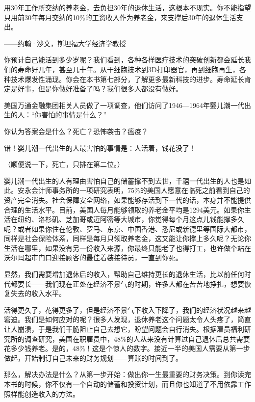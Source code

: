 \begin{BookQuote}
用30年工作所交纳的养老金，去负担30年的退休生活，这根本不现实。你不能指望只用前30年每月交纳的10\%的工资收入作为养老金，来支撑后30年的退休生活支出。

\hfill ——约翰·沙文，斯坦福大学经济学教授
\end{BookQuote}

你预计自己能活到多少岁呢？我们看到，各种各样医疗技术的突破创新都会延长我们的寿命好几年，甚至几十年。从干细胞技术到3D打印器官，再到细胞再生，各种技术爆发性涌现。你会在本书第七部分，了解更多最新科技的进步。寿命延长肯定是好事，但是你做好准备了吗？我们很多人都没有做好。

美国万通金融集团相关人员做了一项调查，他们访问了1946—1964年婴儿潮一代出生的人：“你害怕的事情是什么？”

你认为答案会是什么？死亡？恐怖袭击？瘟疫？

错！婴儿潮一代出生的人最害怕的事情是：人活着，钱花没了！

（顺便说一下，死亡，只排在第二位。）

婴儿潮一代出生的人有理由害怕自己的储蓄撑不到去世，千禧一代出生的人也是如此。安永会计师事务所的一项研究表明，75\%的美国人愿意在临死之前看到自己的资产完全消失。社会保障安全网络，如果能够存活到下一代的话，本身并不能提供合理的生活水平。目前，美国人每月能够领取的养老金平均是1294美元。如果你生活在纽约、洛杉矶、芝加哥或迈阿密等大城市，你觉得每个月这点儿钱能撑多久呢？或者如果你住在伦敦、罗马、东京、中国香港、悉尼或新德里等国际大都市，同样是社会保险体系，同样是每月只领取养老金，这又能让你撑上多久呢？无论你生活在哪里，如果没有另一份收入来源，你最终只能老了也得打工，也许做个站在沃尔玛超市门口迎接顾客的最佳着装接待员，一直到你死。

显然，我们需要增加退休后的收入，帮助自己维持更长的退休生活，比以前任何时代都要长——我们现在正处在经济不景气的时期，许多人都在苦苦地挣扎，想要恢复失去的收入水平。

活得更久了，花得更多了，但是经济不景气下收入下降了，我们的经济状况越来越窘迫。我们是如何应对的呢？很多人发现，退休养老这个问题太令人头疼了，简直让人崩溃，于是我们干脆阻止自己去想它，盼望问题会自行消失。根据雇员福利研究所的调查研究，美国在职雇员中，48\%的人从来没有计算过自己退休后总共需要花多少钱养老。是的，48\%！这是个惊人的数字。接近一半的美国人需要从第一步做起，开始制订自己未来的财务规划——算账的时间到了。

那么，解决办法是什么？从第一步开始：做出你一生最重要的财务决策。到你读完本书的时候，你不仅有一个自动的储蓄和投资计划，而且你也知道了不用依靠工作照样能创造收入的方法。

